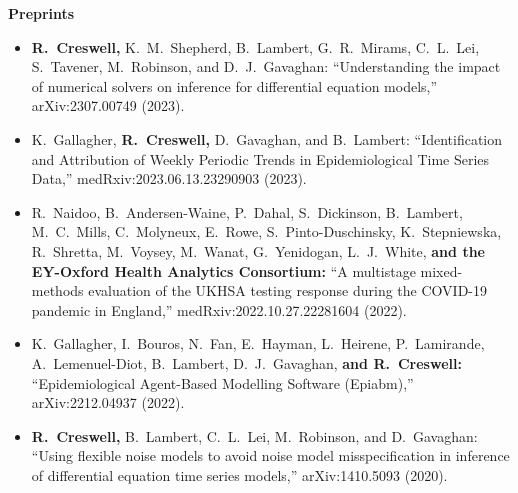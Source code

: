 \documentclass[11pt]{article}
\begin{document}
\vspace*{.4cm}
\noindent\textbf{Preprints}
\vspace*{.5cm}
\begin{itemize}[leftmargin=*]
\setlength{\itemsep}{4pt}
\setlength{\parskip}{0pt}
\setlength{\parsep}{0pt}
\vspace{-.5cm}



\item \textbf{R.\ Creswell,} {\color{gray}K.\ M.\ Shepherd, B.\ Lambert, G.\ R.\ Mirams, C.\ L.\ Lei, S.\ Tavener, M.\ Robinson, and D.\ J.\ Gavaghan:} ``Understanding the impact of numerical solvers on inference for differential equation models,'' arXiv:2307.00749 (2023).  

\item {\color{gray}K.\ Gallagher,} \textbf{R.\ Creswell,} {\color{gray} D.\ Gavaghan, and B.\ Lambert:} ``Identification and Attribution of Weekly Periodic Trends in Epidemiological Time Series Data,'' medRxiv:2023.06.13.23290903 (2023).


\item {\color{gray}R.\ Naidoo, B.\ Andersen-Waine, P.\ Dahal, S.\ Dickinson, B.\ Lambert, M.\ C.\ Mills,  C.\ Molyneux, E.\ Rowe, S.\ Pinto-Duschinsky, K.\ Stepniewska, R.\ Shretta, M.\ Voysey, M.\ Wanat, G.\ Yenidogan, L.\ J.\ White,} \textbf{and the EY-Oxford Health Analytics Consortium:} ``A multistage mixed-methods evaluation of the UKHSA testing response during the COVID-19 pandemic in England,'' medRxiv:2022.10.27.22281604 (2022).


\item {\color{gray}K.\ Gallagher,\textsuperscript{\dag} I.\ Bouros,\textsuperscript{\dag} N.\ Fan,\textsuperscript{\dag} E.\ Hayman,\textsuperscript{\dag} L.\ Heirene,\textsuperscript{\dag} P.\ Lamirande,\textsuperscript{\dag} A.\ Lemenuel-Diot, B.\ Lambert, D.\ J.\ Gavaghan,} \textbf{and R.\ Creswell:} ``Epidemiological Agent-Based Modelling Software (Epiabm),'' arXiv:2212.04937 (2022).


\item \textbf{R.\ Creswell,} {\color{gray} B.\ Lambert, C.\ L.\ Lei, M.\ Robinson, and D.\ Gavaghan:} ``Using flexible noise models to avoid noise model misspecification in inference of differential equation time series models,'' arXiv:1410.5093 (2020).
\end{itemize}

\vspace*{.4cm}
\end{document}
